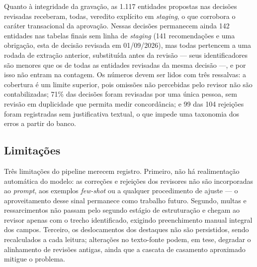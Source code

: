 Quanto à integridade da gravação, as 1.117 entidades propostas nas decisões
revisadas receberam, todas, veredito explícito em \emph{staging}, o que
corrobora o caráter transacional da aprovação. Nessas decisões permanecem
ainda 142 entidades nas tabelas finais sem linha de \emph{staging} (141
recomendações e uma obrigação, esta de decisão revisada em 01/09/2026), mas
todas pertencem a uma rodada de extração anterior, substituída antes da
revisão --- seus identificadores são menores que os de todas as entidades
revisadas da mesma decisão ---, e por isso não entram na contagem. Os números devem ser lidos com
três ressalvas: a cobertura é um limite superior, pois omissões não
percebidas pelo revisor não são contabilizadas; 71\% das decisões foram
revisadas por uma única pessoa, sem revisão em duplicidade que permita medir
concordância; e 99 das 104 rejeições foram registradas sem justificativa
textual, o que impede uma taxonomia dos erros a partir do banco.

\subsection{Limitações}
\label{subsec:validacao-limitacoes}

Três limitações do pipeline merecem registro. Primeiro, não há realimentação
automática do modelo: as correções e rejeições dos revisores não são
incorporadas ao \emph{prompt}, aos exemplos \emph{few-shot} ou a qualquer
procedimento de ajuste --- o aproveitamento desse sinal permanece como
trabalho futuro. Segundo, multas e ressarcimentos não passam pelo segundo
estágio de estruturação e chegam ao revisor apenas com o trecho identificado,
exigindo preenchimento manual integral dos campos. Terceiro, os
deslocamentos dos destaques não são persistidos, sendo recalculados a cada
leitura; alterações no texto-fonte podem, em tese, degradar o alinhamento de
revisões antigas, ainda que a cascata de casamento aproximado mitigue o
problema.
